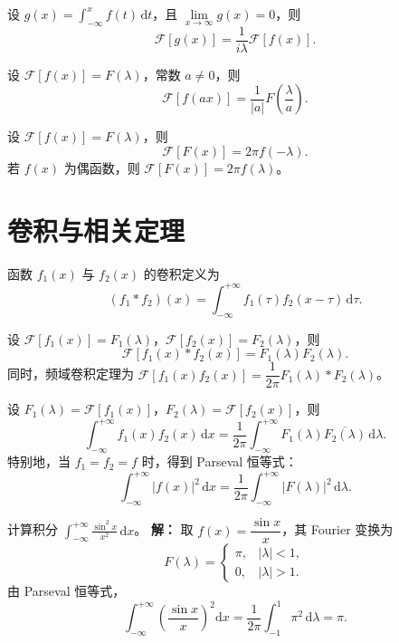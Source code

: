 \begin{theorem}[积分性质]
  设 $g(x)=\int_{-\infty}^{x}f(t)\,\mathrm{d}t$，且 $\lim\limits_{x\to\infty}g(x)=0$，则
  \[
  \mathcal{F}[g(x)]=\frac{1}{i\lambda}\mathcal{F}[f(x)].
  \]
\end{theorem}

\begin{theorem}
  设 $\mathcal{F}[f(x)]=F(\lambda)$，常数 $a\neq 0$，则
  \[
  \mathcal{F}[f(ax)]=\frac{1}{|a|}F\left(\frac{\lambda}{a}\right).
  \]
\end{theorem}

\begin{theorem}[对称性质]
  设 $\mathcal{F}[f(x)]=F(\lambda)$，则
  \[
  \mathcal{F}[F(x)]=2\pi f(-\lambda).
  \]
  若 $f(x)$ 为偶函数，则 $\mathcal{F}[F(x)]=2\pi f(\lambda)$。
\end{theorem}

\section{卷积与相关定理}

\begin{definition}[卷积]
  函数 $f_1(x)$ 与 $f_2(x)$ 的卷积定义为
  \[
  (f_1*f_2)(x)=\int_{-\infty}^{+\infty}f_1(\tau)f_2(x-\tau)\,\mathrm{d}\tau.
  \]
\end{definition}

\begin{theorem}[卷积定理]
  设 $\mathcal{F}[f_1(x)]=F_1(\lambda)$，$\mathcal{F}[f_2(x)]=F_2(\lambda)$，则
  \[
  \mathcal{F}[f_1(x)*f_2(x)]=F_1(\lambda)F_2(\lambda).
  \]
  同时，频域卷积定理为 $\mathcal{F}[f_1(x)f_2(x)]=\dfrac{1}{2\pi}F_1(\lambda)*F_2(\lambda)$。
\end{theorem}

\begin{theorem}
  设 $F_1(\lambda)=\mathcal{F}[f_1(x)]$，$F_2(\lambda)=\mathcal{F}[f_2(x)]$，则
  \[
  \int_{-\infty}^{+\infty}f_1(x)f_2(x)\,\mathrm{d}x
  =\frac{1}{2\pi}\int_{-\infty}^{+\infty}F_1(\lambda)\overline{F_2(\lambda)}\,\mathrm{d}\lambda.
  \]
  特别地，当 $f_1=f_2=f$ 时，得到 Parseval 恒等式：
  \[
  \int_{-\infty}^{+\infty}|f(x)|^2\,\mathrm{d}x = \frac{1}{2\pi}\int_{-\infty}^{+\infty}|F(\lambda)|^2\,\mathrm{d}\lambda.
  \]
\end{theorem}

\begin{tcolorbox}[title=例 11：Parseval 恒等式求积分, colframe=orange!75!black, colback=orange!5!white, sharp corners]
  计算积分 $\displaystyle\int_{-\infty}^{+\infty}\frac{\sin^2 x}{x^2}\,\mathrm{d}x$。
  \tcbline
  \textbf{解：} 取 $f(x)=\dfrac{\sin x}{x}$，其 Fourier 变换为
  \[
  F(\lambda)=\begin{cases}
    \pi, & |\lambda|<1,\\
    0, & |\lambda|>1.
  \end{cases}
  \]
  由 Parseval 恒等式，
  \[
  \int_{-\infty}^{+\infty}\left(\frac{\sin x}{x}\right)^2\mathrm{d}x
  =\frac{1}{2\pi}\int_{-1}^{1}\pi^2\,\mathrm{d}\lambda = \pi.
  \]
\end{tcolorbox}

